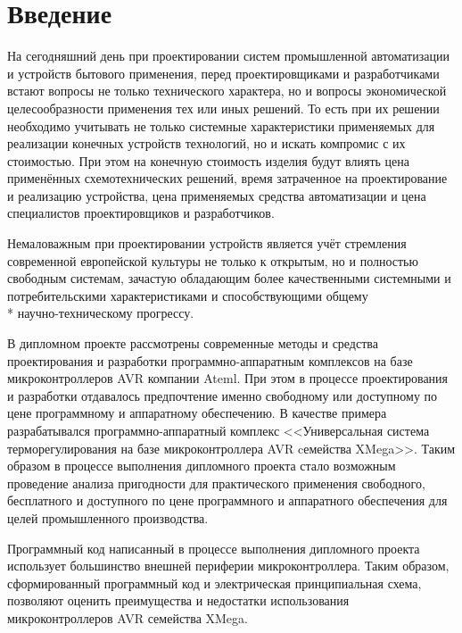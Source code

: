 \section*{Введение}
\begin{par}
На сегодняшний день при проектировании систем промышленной автоматизации и устройств
бытового применения, перед проектировщиками и разработчиками встают вопросы не только технического
характера, но и вопросы экономической целесообразности применения тех или иных решений.
То есть при их решении необходимо учитывать не только системные характеристики применяемых для
реализации конечных устройств технологий, но и искать компромис с их стоимостью. При этом
на конечную стоимость изделия будут влиять цена применённых схемотехнических решений,
время затраченное на проектирование и реализацию устройства, цена применяемых средства автоматизации
и цена специалистов проектировщиков и разработчиков.
\end{par}

\begin{par}
Немаловажным при проектировании устройств является учёт стремления
современной европейской культуры не только к открытым, но и полностью свободным системам,
зачастую обладающим более качественными системными и
потребительскими характеристиками и способствующими общему\\*
научно-техническому прогрессу\cite{lessing}.
\end{par}


В дипломном проекте рассмотрены современные методы и средства проектирования и разработки
программно-аппаратным комплексов на базе микроконтроллеров AVR компании Ateml. При этом
в процессе проектирования и разработки отдавалось предпочтение именно свободному или
доступному по цене программному и аппаратному обеспечению. В качестве примера разрабатывался
программно-аппаратный комплекс <<Универсальная система терморегулирования на базе
микроконтроллера AVR cемейства XMega>>. Таким образом в процессе выполнения дипломного проекта
стало возможным проведение анализа пригодности для практического применения свободного,
бесплатного и доступного по цене программного и аппаратного обеспечения для целей промышленного
производства.

Программный код написанный в процессе выполнения дипломного проекта использует большинство
внешней периферии микроконтроллера. Таким образом, сформированный программный код и электрическая
принципиальная схема, позволяют оценить преимущества и недостатки использования
микроконтроллеров AVR семейства XMega.

\newpage{}

